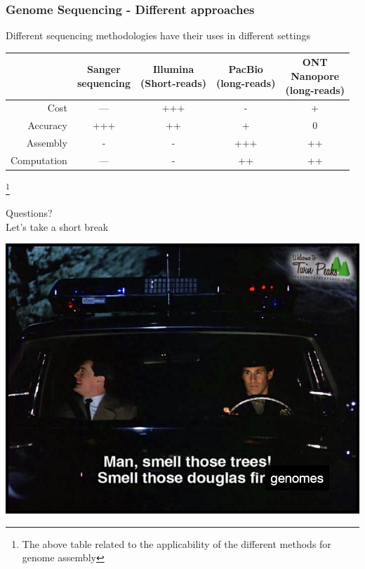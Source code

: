 \documentclass{beamer}
\newcommand\blfootnote[1]{%
	\begingroup
	\renewcommand\thefootnote{}\footnote{#1}%
	\addtocounter{footnote}{-1}%
	\endgroup
}
\begin{document}
\begin{frame}
	\frametitle{Genome Sequencing - Different approaches}
	
Different sequencing methodologies have their uses in different settings\\
	
\begin{tabular}{|r|c|c|c|c|}
\hline
	&\thead{Sanger\\ sequencing}& \thead{Illumina\\(Short-reads)} & \thead{PacBio\\(long-reads)} &  \thead{ONT\\Nanopore\\(long-reads)}\\
	\hline
	Cost & --- & +++ & - & + \\
	Accuracy & +++ & ++ & +  & 0 \\ 
	Assembly & - & - & +++ & ++ \\
	Computation & --- & - & ++ & ++ \\
	\hline
\end{tabular}
\blfootnote{The above table related to the applicability of the different methods for genome assembly}
\end{frame}


\begin{frame}
	
	\Huge
	Questions? \\ \pause
	Let's take a short break
	
\end{frame}


\begin{frame}
			\includegraphics[width=\textwidth]{img/cooper}
	\end{frame}
	
\end{document}

